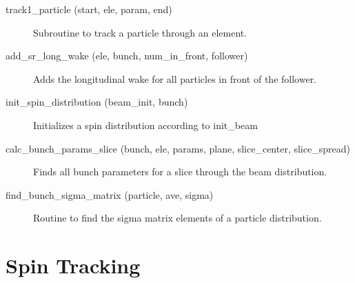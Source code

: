 \begin{description}
\item[track1_particle (start, ele, param, end)] \Newline 
Subroutine to track a particle through an element.

\item[add_sr_long_wake (ele, bunch, num_in_front, follower)] \Newline 
Adds the longitudinal wake for all particles in front of the follower.

\item[init_spin_distribution (beam_init, bunch)] \Newline 
Initializes a spin distribution according to init_beam%

\item[calc_bunch_params_slice (bunch, ele, params, plane, slice_center, slice_spread)] \Newline 
Finds all bunch parameters for a slice through the beam distribution.

\item[find_bunch_sigma_matrix (particle, ave, sigma)] \Newline 
Routine to find the sigma matrix elements of a particle distribution.

\end{description}

\section{Spin Tracking}
\label{r:spin_track}    


